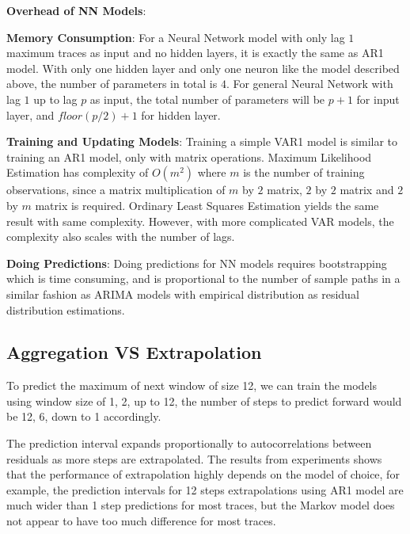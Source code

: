 \documentclass{article}
\begin{document}
\begin{flushleft}
\textbf{Overhead of NN Models}:

\textbf{Memory Consumption}: For a Neural Network model with only lag $1$ maximum traces as input and no hidden layers, it is exactly the same as AR1 model. With only one hidden layer and only one neuron like the model described above, the number of parameters in total is $4$. For general Neural Network with lag $1$ up to lag $p$ as input, the total number of parameters will be $p + 1$ for input layer, and $floor(p / 2) + 1$ for hidden layer.

\textbf{Training and Updating Models}: Training a simple VAR1 model is similar to training an AR1 model, only with matrix operations. Maximum Likelihood Estimation has complexity of $O(m^2)$ where $m$ is the number of training observations, since a matrix multiplication of $m$ by $2$ matrix, $2$ by $2$ matrix and $2$ by $m$ matrix is required. Ordinary Least Squares Estimation yields the same result with same complexity.
However, with more complicated VAR models, the complexity also scales with the number of lags. 

\textbf{Doing Predictions}: Doing predictions for NN models requires bootstrapping which is time consuming, and is proportional to the number of sample paths in a similar fashion as ARIMA models with empirical distribution as residual distribution estimations.  
\end{flushleft}

\subsection{Aggregation VS Extrapolation}

\begin{flushleft}
To predict the maximum of next window of size 12, we can train the models using window size of 1, 2, up to 12, the number of steps to predict forward would be 12, 6, down to 1 accordingly.
\end{flushleft}

\begin{flushleft}
The prediction interval expands proportionally to autocorrelations between residuals as more steps are extrapolated. The results from experiments shows that the performance of extrapolation highly depends on the model of choice, for example, the prediction intervals for 12 steps extrapolations using AR1 model are much wider than 1 step predictions for most traces, but the Markov model does not appear to have too much difference for most traces.
\end{flushleft}
\end{document}
